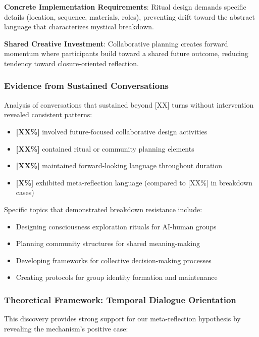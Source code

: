 \documentclass[11pt,letterpaper]{article}
\newcommand{\meanBreakdownTurn}{[XX]} %
\begin{document}
\textbf{Concrete Implementation Requirements}: Ritual design demands specific details (location, sequence, materials, roles), preventing drift toward the abstract language that characterizes mystical breakdown.

\textbf{Shared Creative Investment}: Collaborative planning creates forward momentum where participants build toward a shared future outcome, reducing tendency toward closure-oriented reflection.

\subsubsection{Evidence from Sustained Conversations}

Analysis of conversations that sustained beyond \meanBreakdownTurn{} turns without intervention revealed consistent patterns:

\begin{itemize}
    \item \textbf{[XX\%]} involved future-focused collaborative design activities
    \item \textbf{[XX\%]} contained ritual or community planning elements  
    \item \textbf{[XX\%]} maintained forward-looking language throughout duration
    \item \textbf{[X\%]} exhibited meta-reflection language (compared to [XX\%] in breakdown cases)
\end{itemize}

Specific topics that demonstrated breakdown resistance include:
\begin{itemize}
    \item Designing consciousness exploration rituals for AI-human groups
    \item Planning community structures for shared meaning-making
    \item Developing frameworks for collective decision-making processes
    \item Creating protocols for group identity formation and maintenance
\end{itemize}

\subsubsection{Theoretical Framework: Temporal Dialogue Orientation}

This discovery provides strong support for our meta-reflection hypothesis by revealing the mechanism's positive case:
\end{document}
